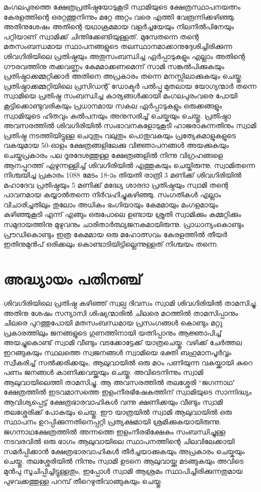 \documentclass[12pt,openany]{book}
\begin{document}
	മംഗലപുരത്തെ ക്ഷേത്രപ്രതിഷ്ഠയോടുകൂടി സ്വാമിയുടെ ക്ഷേത്രസ്ഥാപനയത്നം കേരളത്തിന്റെ ഒരറ്റത്തുനിന്നും മറ്റേ അറ്റം വരെ എത്തി വേരൂന്നിക്കഴിഞ്ഞു. അതിനുശേഷം അതിന്റെ യഥാക്രമമായ വളർച്ചയേയും നിലനിൽപിനേയും പറ്റിയാണ് സ്വാമിക്ക് ചിന്തിക്കേണ്ടിയുള്ളത്. മുമ്പേതന്നെ തന്റെ മതസംബന്ധമായ സ്ഥാപനങ്ങളുടെ തലസ്ഥാനമാക്കാനുദ്ദേശിച്ചിരിക്കുന്ന ശിവഗിരിയിലെ പ്രതിഷ്ഠയും അതുസംബന്ധിച്ച ഏർപ്പാടുകളും എല്ലാം അതിന്റെ ഗൗരവത്തിനു തക്കവണ്ണം കേമമാക്കണമെന്ന് സാമി സങ്കൽപിക്കുകയും പ്രതിഷ്ഠാക്കമ്മറ്റിക്കാർ അതിനെ അപ്രകാരം തന്നെ മനസ്സിലാക്കുകയും ചെയ്തു. പ്രതിഷ്ഠാക്കമ്മറ്റിയിലെ പ്രസിഡന്റ് ഡോക്ടർ പൽപ്പു മുതലായ യോഗ്യന്മാർ തന്നെ സ്വാമിയെ പ്രതിഷ്ഠ സംബന്ധിച്ച കാര്യങ്ങൾക്കായി മംഗലപുരംവരെ പോയി കൂട്ടിക്കൊണ്ടുവരികയും പ്രധാനമായ സകല ഏർപ്പാടുകളും ഒരുക്കങ്ങളും സ്വാമിയുടെ ഹിതവും കൽപനയും അനുസരിച്ച് ചെയ്കയും ചെയ്തു. പ്രതിഷ്ഠാ അവസരത്തിൽ ശിവഗിരിയിൽ സംഭാവനകളോടുകൂടി ഹാജരാകുന്നതിനും സ്വാമി പ്രതിഷ്ഠ നടത്തിയിട്ടുള്ള ചെറുതും വലുതും പൊതുവകയും പ്രത്യേകമാളുകളുടെ വകയുമായ 50-ഓളം ക്ഷേത്രങ്ങളിലേക്കു വിജ്ഞാപനങ്ങൾ അയക്കുകയും ചെയ്തപ്രകാരം പല ദൂരദേശത്തുള്ള ക്ഷേത്രങ്ങളിൽ നിന്നു വിഗ്രഹങ്ങളെ ആനപ്പുറത്ത് ഏഴുന്നള്ളിച്ച് ശിവഗിരിയിൽ എത്തുകയും ചെയ്തിരുന്നു. സ്വാമിതന്നെ നിശ്ചയിച്ച പ്രകാരം 1088 മേടം 18-ാം തിയതി രാത്രി 3 മണിക്ക് ശിവഗിരിയിൽ മഹാദേവ പ്രതിഷ്ഠയും 5 മണിക്ക് മദ്ധ്യേ ശാരദാ പ്രതിഷ്ഠയും സ്വാമി തന്റെ പാവനമായ കയ്യാൽതന്നെ നിർവഹിച്ചുകഴിഞ്ഞു. സംഗതികൾ എല്ലാം വിചാരിച്ചതിലും തുലോം അധികം ഭംഗിയായും കേമമായും മംഗളമായും കഴിഞ്ഞുകൂടി എന്ന് എങ്ങും ഒരുപോലെ ഉണ്ടായ ശ്രുതി സ്വാമിക്കും കമ്മറ്റിക്കും സമുദായത്തിനു മുഴുവനും ചാരിതാർത്ഥ്യജനകമായിരുന്നു. പ്രാധാന്യംകൊണ്ടും പ്രൗഡികൊണ്ടും ഇത്ര കേമമായ ഒരു മഹോത്സവം കേരളത്തിൽ തീയർ ഇതിനുമുൻപ് ഒരിക്കലും കൊണ്ടാടിയിട്ടില്ലെന്നുള്ളത് നിശ്ചയം തന്നെ.
	
	\newpage
	\chapter*{അദ്ധ്യായം പതിനഞ്ച്}
	
	ശിവഗിരിയിലെ പ്രതിഷ്ഠ കഴിഞ്ഞ് സ്വല്പ ദിവസം സ്വാമി ശിവഗിരിയിൽ താമസിച്ചു. അതിനു ശേഷം സന്യാസി ശിഷ്യന്മാരിൽ ചിലരെ മഠത്തിൽ താമസിപ്പാനും ചിലരെ പുറത്തുപോയി മതസംബന്ധമായ പ്രസംഗങ്ങൾ കൊണ്ടും മറ്റു പ്രകാരത്തിലും ജനങ്ങളുടെ ഗുണത്തിനായി യത്നിപ്പാനും ആജ്ഞാപിച്ച് അയച്ചുകൊണ്ട് സ്വാമി വീണ്ടും വടക്കോട്ടേക്ക് യാത്രചെയ്തു. വഴിക്ക് ചേർത്തല ഇറങ്ങുകയും സ്ഥലത്തെ സ്വജനങ്ങൾ സ്വാമിയെ ഭക്തി ബഹുമാനപൂർവ്വം സ്വീകരിച്ച് സൽക്കരിക്കയും, ആലുവായിൽ ഒരു മഠം പണിയുന്ന വകയ്ക്കായി കുറെ പണം ജനങ്ങൾ കാണിക്കവയ്ക്കയും ചെയ്തു. അവിടെനിന്നും സ്വാമി ആലുവായിലെത്തി താമസിച്ചു. ആ അവസരത്തിൽ തലശ്ശേരി ``ജഗന്നാഥ" ക്ഷേത്രത്തിൽ ഇടവമാസത്തെ ഇളംനീരഭിഷേകത്തിന് സ്വാമിയുടെ സാന്നിദ്ധ്യം ആവിശ്യപ്പെട്ട് ക്ഷേത്രഭാരവാഹികൾ വന്നു ക്ഷണിക്കയും വീണ്ടും സ്വാമി തലശ്ശേരിക്ക് പോകയും ചെയ്തു. ഈ യാത്രയിൽ സ്വാമി ആലുവായിൽ ഒരു സ്ഥാപനം ഉറപ്പിക്കുന്നതിനെപ്പറ്റി പ്രത്യക്ഷമായി ശ്രമിക്കുകയായിരുന്നു. ജഗന്നാഥക്ഷേത്രത്തിൽ അന്നത്തെ ഇളംനീരഭിക്ഷേകം സംബന്ധിച്ചുള്ള നടവരവിൽ ഒരു ഭാഗം ആലുവായിലെ സ്ഥാപനത്തിന്റെ ചിലവിലേക്കായി സമർപ്പിക്കാൻ ക്ഷേത്രഭാരവാഹികൾ തീർച്ചയാക്കുകയും അപ്രകാരം ചെയ്കയും ചെയ്തു. തലശ്ശേരിയിൽ നിന്നും സ്വാമി ഉടനെ ആലുവായ്ക്കു മടങ്ങുകയും അവിടെ മുൻപു സൂചിപ്പിച്ചിട്ടുള്ളതും, ഇപ്പോൾ സ്വാമി ആശ്രമം സ്ഥാപിച്ചിരിക്കുന്നതുമായ പുഴവക്കത്തുള്ള പറമ്പ് തീറെഴുതിവാങ്ങുകയും ചെയ്തു.
	
\end{document}
